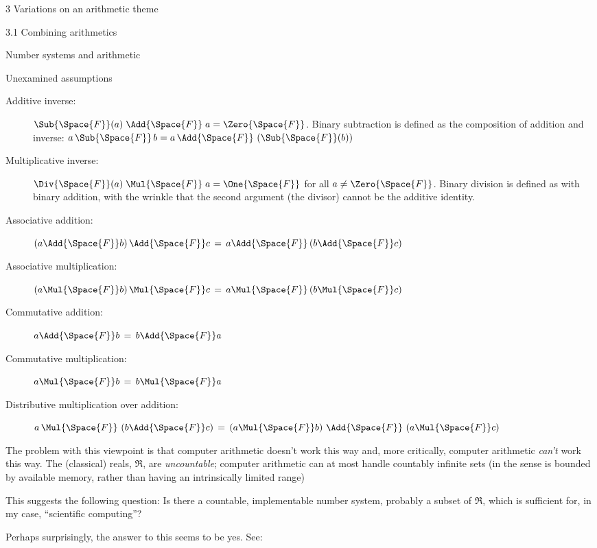 \documentclass[12pt]{PalisadesLakesBook}
\begin{document}
\begin{plSection}{3 Variations on an arithmetic theme}
\begin{plSection}{3.1 Combining arithmetics}
\begin{plSection}{Number systems and arithmetic}
\begin{plSection}{Unexamined assumptions}
\begin{description}
\item[Additive inverse:] 
$\Sub{\Space{F}}(a) \;\Add{\Space{F}}\; a = \Zero{\Space{F}}$.
Binary subtraction is defined as the composition 
of addition and inverse:
$a \,\Sub{\Space{F}}\, b = 
a \,\Add{\Space{F}}\, \left(\Sub{\Space{F}}(b)\right) $

\item[Multiplicative inverse:] 
$\Div{\Space{F}}(a) \;\Mul{\Space{F}}\; a = \One{\Space{F}}$ for all $a \neq \Zero{\Space{F}}$.
Binary division is defined as with binary addition,
with the wrinkle that the second argument (the divisor)
cannot be the additive identity.

\item[Associative addition:] 
$\left( a \Add{\Space{F}} b \right)  \Add{\Space{F}} c 
\,=\, 
a  \Add{\Space{F}} \left( b  \Add{\Space{F}} c \right)$

\item[Associative multiplication:] 
$\left( a  \Mul{\Space{F}} b \right) \Mul{\Space{F}} c 
\,=\, 
a \Mul{\Space{F}} \left( b \Mul{\Space{F}} c \right)$

\item[Commutative addition:] 
$a \Add{\Space{F}} b \,=\, b \Add{\Space{F}} a$

\item[Commutative multiplication:] 
$a \Mul{\Space{F}} b \,=\, b \Mul{\Space{F}} a$

\item[Distributive multiplication over addition:] 
$a \, \Mul{\Space{F}} \, \left( b \Add{\Space{F}} c \right)
\,=\, 
\left(a \Mul{\Space{F}} b \right) 
\, \Add{\Space{F}} \, 
\left(a \Mul{\Space{F}} c \right)$

\end{description}

The problem with this viewpoint is that computer arithmetic
doesn't work this way
and, more critically, computer arithmetic \emph{can't} work
this way.
The (classical) reals, $\Re$, are \emph{uncountable};
computer arithmetic can at most handle countably infinite sets
(in the sense is bounded by available memory,
rather than having an intrinsically limited range)

This suggests the following question:
Is there a countable, implementable number system,
probably a subset of $\Re$,
which is sufficient for, in my case,
``scientific computing''?

Perhaps surprisingly, the answer to this seems to be yes.
See: 



\end{plSection}
\end{plSection}
\end{plSection}
\end{plSection}
\end{document}
